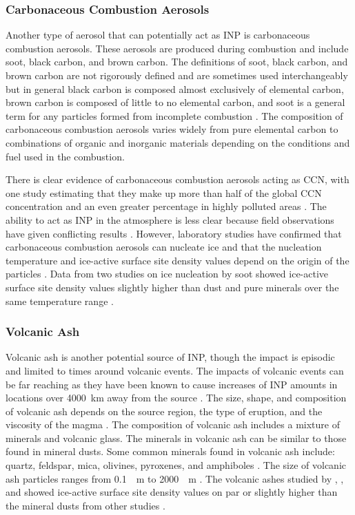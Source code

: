 \subsubsection{Carbonaceous Combustion Aerosols}
Another type of aerosol that can potentially act as INP is carbonaceous combustion aerosols. These aerosols are produced during combustion and include soot, black carbon, and brown carbon. The definitions of soot, black carbon, and brown carbon are not rigorously defined and are sometimes used interchangeably but in general black carbon is composed almost exclusively of elemental carbon, brown carbon is composed of little to no elemental carbon, and soot is a general term for any particles formed from incomplete combustion \citep{lon2013}. The composition of carbonaceous combustion aerosols varies widely from pure elemental carbon to combinations of organic and inorganic materials depending on the conditions and fuel used in the combustion. \citep{spra2011,mur2012,ull2017}

There is clear evidence of carbonaceous combustion aerosols acting as CCN, with one study estimating that they make up more than half of the global CCN concentration and an even greater percentage in highly polluted areas \citep{spra2011}. The ability to act as INP in the atmosphere is less clear because field observations have given conflicting results \citep{mur2012}. However, laboratory studies have confirmed that carbonaceous combustion aerosols can nucleate ice and that the nucleation temperature and ice-active surface site density values depend on the origin of the particles \citep[e.g.][]{demo1990, dieh1998, pett2009}. Data from two studies on ice nucleation by soot showed ice-active surface site density values slightly higher than dust and pure minerals over the same temperature range \citep{mur2012}.

\subsubsection{Volcanic Ash}
Volcanic ash is another potential source of INP, though the impact is episodic and limited to times around volcanic events. The impacts of volcanic events can be far reaching as they have been known to cause increases of INP amounts in locations over \SI{4000}{km} away from the source \citep{bing2012}. The size, shape, and composition of volcanic ash depends on the source region, the type of eruption, and the viscosity of the magma \citep{heik1972}. The composition of volcanic ash includes a mixture of minerals and volcanic glass. The minerals in volcanic ash can be similar to those found in mineral dusts. Some common minerals found in volcanic ash include: quartz, feldspar, mica, olivines, pyroxenes, and amphiboles \citep{horw2006, dura2010, dags2013}. The size of volcanic ash particles ranges from \SI{0.1}{\mu m} to \SI{2000}{\mu m} \citep{dura2010}. The volcanic ashes studied by \cite{forn2009}, \cite{hoyl2011}, and \cite{stei2011} showed ice-active surface site density values on par or slightly higher than the mineral dusts from other studies \citep[e.g.][]{mur2012,ull2017}.

